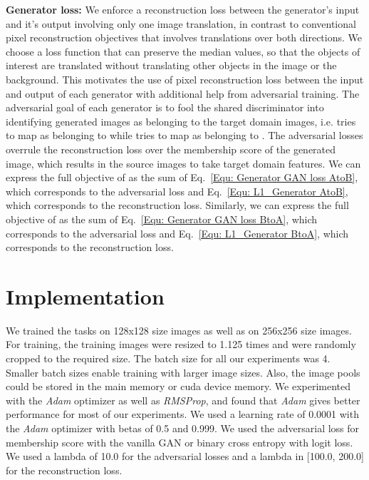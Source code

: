 \documentclass[a4paper,twoside]{article}
\begin{document}
\noindent\textbf{Generator loss:}
We enforce a reconstruction loss between the generator's input and it's output involving only one image translation, in contrast to conventional pixel reconstruction objectives that involves translations over both directions. We choose a loss function that can preserve the median values, so that the objects of interest are translated without translating other objects in the image or the background. This motivates the use of  pixel reconstruction loss between the input and output of each generator with additional help from adversarial training. The adversarial goal of each generator is to fool the shared discriminator into identifying generated images as belonging to the target domain images, i.e.  tries to map  as belonging to  while  tries to map  as belonging to . The adversarial losses overrule the reconstruction loss over the membership score of the generated image, which results in the source images to take target domain features. We can express the full objective of  as the sum of Eq.~\ref{Equ: Generator GAN loss AtoB}, which corresponds to the adversarial loss and Eq.~\ref{Equ: L1_Generator AtoB}, which corresponds to the  reconstruction loss. Similarly, we can express the full objective of  as the sum of Eq.~\ref{Equ: Generator GAN loss BtoA}, which corresponds to the adversarial loss and Eq.~\ref{Equ: L1_Generator BtoA}, which corresponds to the  reconstruction loss.

\section{Implementation}
\label{Implementation}
\noindent
We trained the tasks on 128x128 size images as well as on 256x256 size images. For training, the training images were resized to 1.125 times and were randomly cropped to the required size. The batch size for all our experiments was 4. Smaller batch sizes enable training with larger image sizes. Also, the image pools could be stored in the main memory or cuda device memory. We experimented with the \textit{Adam} optimizer as well as \textit{RMSProp}, and found that \textit{Adam} gives better performance for most of our experiments. We used a learning rate of 0.0001 with the \textit{Adam} optimizer with betas of 0.5 and 0.999. We used the adversarial loss for membership score with the vanilla GAN or binary cross entropy with logit loss. We used a lambda of 10.0 for the adversarial losses and a lambda in [100.0, 200.0] for the reconstruction loss. 
\end{document}
